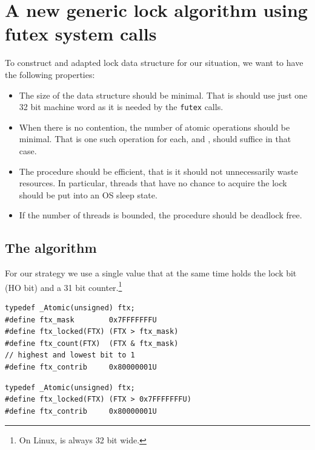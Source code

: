 \section{A new generic lock algorithm using futex system calls}
\label{sec-3}

\iflong%
To construct and adapted lock data structure for our situation, we
want to have the following properties:

\begin{itemize}
\item The size of the data structure should be minimal. That is should
use just one 32 bit machine word as it is needed by the \texttt{futex}
calls.\itemadjust

\item When there is no contention, the number of atomic operations should
be minimal. That is one such operation for each,  and
, should suffice in that case.\itemadjust

\item The procedure should be efficient, that is it should not
unnecessarily waste resources. In particular, threads that have no
chance to acquire the lock should be put into an OS sleep
state.\itemadjust

\item If the number of threads is bounded, the procedure should be
deadlock free.\itemadjust
\end{itemize}

\subsection{The algorithm}
\label{sec-3-1}
\fi

For our strategy we use a single  value that at the same
time holds the lock bit (HO bit) and a 31 bit counter.\footnote{On Linux,  is always 32 bit wide.}

\lstset{language=C11,label= ,caption= ,numbers=none}
\iflong%
\begin{lstlisting}
typedef _Atomic(unsigned) ftx;
#define ftx_mask        0x7FFFFFFFU
#define ftx_locked(FTX) (FTX > ftx_mask)
#define ftx_count(FTX)  (FTX & ftx_mask)
// highest and lowest bit to 1
#define ftx_contrib     0x80000001U
\end{lstlisting}
\else
\begin{lstlisting}
typedef _Atomic(unsigned) ftx;
#define ftx_locked(FTX) (FTX > 0x7FFFFFFFU)
#define ftx_contrib     0x80000001U
\end{lstlisting}
\fi

